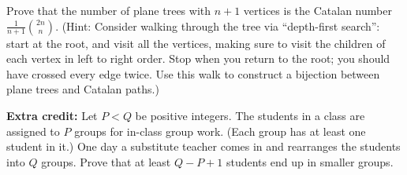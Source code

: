 \begin{center}
\end{center}
Prove that the number of plane trees with $n+1$ vertices is the Catalan number $\frac{1}{n+1}\binom{2n}{n}$.  (Hint: Consider walking through the tree via ``depth-first search'': start at the root, and visit all the vertices, making sure to visit the children of each vertex in left to right order.  Stop when you return to the root; you should have crossed every edge twice.  Use this walk to construct a bijection between plane trees and Catalan paths.)

\vfill
{\bf Extra credit:} Let $P<Q$ be positive integers.  The students in a class are assigned to $P$ groups for in-class group work.  (Each group has at least one student in it.)  One day a substitute teacher comes in and rearranges the students into $Q$ groups.  Prove that at least $Q-P+1$ students end up in smaller groups.


